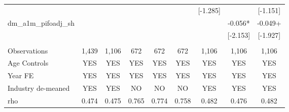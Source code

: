 \documentclass[]{article}
\begin{document}
\begin{tabular}{lcccccccc}
 &  &  &  &  &  & [-1.285] &  & [-1.151] \\
dm\_a1m\_pifoadj\_sh &  &  &  &  &  &  & -0.056* & -0.049+ \\
 &  &  &  &  &  &  & [-2.153] & [-1.927] \\
 &  &  &  &  &  &  &  &  \\
Observations & 1,439 & 1,106 & 672 & 672 & 672 & 1,106 & 1,106 & 1,106 \\
Age Controls & YES & YES & YES & YES & YES & YES & YES & YES \\
Year FE & YES & YES & YES & YES & YES & YES & YES & YES \\
Industry de-meaned & YES & YES & NO & NO & NO & YES & YES & YES \\
 rho & 0.474 & 0.475 & 0.765 & 0.774 & 0.758 & 0.482 & 0.476 & 0.482 \\ \hline
\end{tabular}
\end{document}
